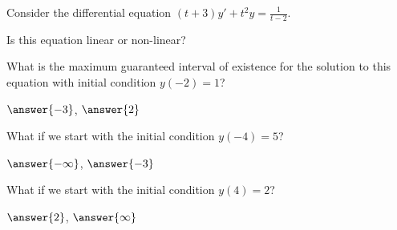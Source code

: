 \documentclass{ximera}
\begin{document}
\begin{exercise}
    Consider the differential equation $(t+3)y' + t^2 y = \frac{1}{t-2}$. 

    Is this equation linear or non-linear?
    \begin{multipleChoice}
    \end{multipleChoice}
    \begin{problem}
        What is the maximum guaranteed interval of existence for the solution to this equation with initial condition $y(-2) = 1$?
        
        \wordChoice{\choice[correct]{(},\choice{[}}$\answer{-3}$, $\answer{2}$\wordChoice{\choice[correct]{)},\choice{]}}
        \begin{problem}        
            What if we start with the initial condition $y(-4) = 5$?
            
            \wordChoice{\choice[correct]{(},\choice{[}}$\answer{-\infty}$, $\answer{-3}$\wordChoice{\choice[correct]{)},\choice{]}}
            \begin{problem}        
                What if we start with the initial condition $y(4) = 2$?
                
                \wordChoice{\choice[correct]{(},\choice{[}}$\answer{2}$, $\answer{\infty}$\wordChoice{\choice[correct]{)},\choice{]}}
            \end{problem}
        \end{problem}
    \end{problem}
\end{exercise}
\end{document}
